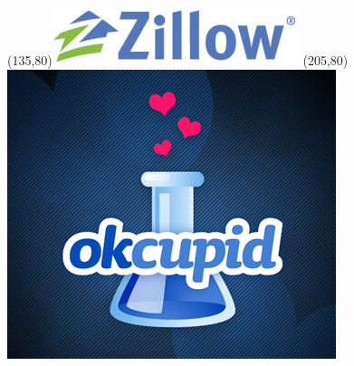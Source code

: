 \begin{frame}
\Put(135,80){\includegraphics[scale=.25]{../common/pics/R_using_logos/zillow}}
\Put(205,80){\includegraphics[scale=.15]{../common/pics/R_using_logos/okcupid}}
\end{frame}
